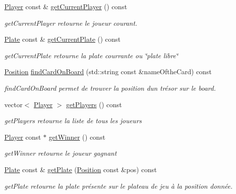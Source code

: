 \begin{DoxyCompactItemize}
\mbox{\hyperlink{class_player}{Player}} const  \& \mbox{\hyperlink{class_game_a202099c9ce99f80dc84091761d3292eb}{get\+Current\+Player}} () const
\begin{DoxyCompactList}\small\item\em get\+Current\+Player retourne le joueur courant. \end{DoxyCompactList}\item 
\mbox{\hyperlink{class_plate}{Plate}} const  \& \mbox{\hyperlink{class_game_a09dad4385b60fb6af3c93de9d7dad0dd}{get\+Current\+Plate}} () const
\begin{DoxyCompactList}\small\item\em get\+Current\+Plate retourne la plate courrante ou \char`\"{}plate libre\char`\"{} \end{DoxyCompactList}\item 
\mbox{\hyperlink{class_position}{Position}} \mbox{\hyperlink{class_game_a5d8355f24fa21135389876710cf8cbf3}{find\+Card\+On\+Board}} (std\+::string const \&name\+Ofthe\+Card) const
\begin{DoxyCompactList}\small\item\em find\+Card\+On\+Board permet de trouver la position d\textquotesingle{}un trésor sur le board. \end{DoxyCompactList}\item 
vector$<$ \mbox{\hyperlink{class_player}{Player}} $>$ \mbox{\hyperlink{class_game_a8561913d7635ac1ded36b0236ece61f7}{get\+Players}} () const
\begin{DoxyCompactList}\small\item\em get\+Players retourne la liste de tous les joueurs \end{DoxyCompactList}\item 
\mbox{\hyperlink{class_player}{Player}} const  $\ast$ \mbox{\hyperlink{class_game_af1698fea8cf96a95427a1c5e363eac37}{get\+Winner}} () const
\begin{DoxyCompactList}\small\item\em get\+Winner retourne le joueur gagnant \end{DoxyCompactList}\item 
\mbox{\hyperlink{class_plate}{Plate}} const  \& \mbox{\hyperlink{class_game_a669625eaa5a522e8012a3a5ea4bb1a39}{get\+Plate}} (\mbox{\hyperlink{class_position}{Position}} const \&pos) const
\begin{DoxyCompactList}\small\item\em get\+Plate retourne la plate présente sur le plateau de jeu à la position donnée. \end{DoxyCompactList}\item 

\end{DoxyCompactItemize}
